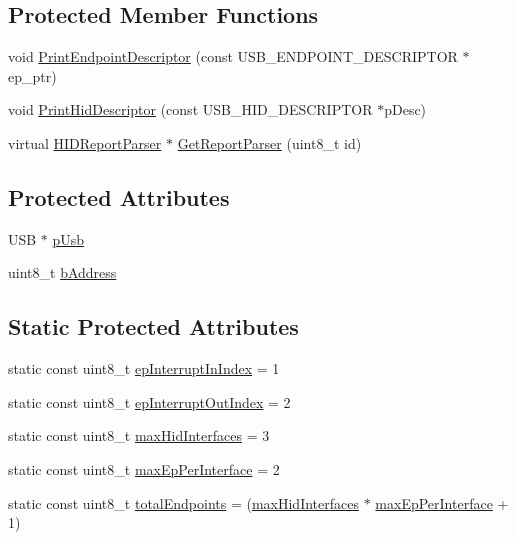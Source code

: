 \subsection*{\-Protected \-Member \-Functions}
\begin{DoxyCompactItemize}
\item 
void \hyperlink{class_h_i_d_a9e2e57ffd2701ebd171842fa9a3f54bd}{\-Print\-Endpoint\-Descriptor} (const \-U\-S\-B\-\_\-\-E\-N\-D\-P\-O\-I\-N\-T\-\_\-\-D\-E\-S\-C\-R\-I\-P\-T\-O\-R $\ast$ep\-\_\-ptr)
\item 
void \hyperlink{class_h_i_d_a733e3944b51dced26ef257f047c227dc}{\-Print\-Hid\-Descriptor} (const \-U\-S\-B\-\_\-\-H\-I\-D\-\_\-\-D\-E\-S\-C\-R\-I\-P\-T\-O\-R $\ast$p\-Desc)
\item 
virtual \hyperlink{class_h_i_d_report_parser}{\-H\-I\-D\-Report\-Parser} $\ast$ \hyperlink{class_h_i_d_ac51c88a0be514a748598008d312adc1d}{\-Get\-Report\-Parser} (uint8\-\_\-t id)
\end{DoxyCompactItemize}
\subsection*{\-Protected \-Attributes}
\begin{DoxyCompactItemize}
\item 
\-U\-S\-B $\ast$ \hyperlink{class_h_i_d_a1583e665c2b930e8683c10dc271f013f}{p\-Usb}
\item 
uint8\-\_\-t \hyperlink{class_h_i_d_a525edb36c2cd8470eae703d3b236e4a7}{b\-Address}
\end{DoxyCompactItemize}
\subsection*{\-Static \-Protected \-Attributes}
\begin{DoxyCompactItemize}
\item 
static const uint8\-\_\-t \hyperlink{class_h_i_d_a845b9961830a6778c296e8571759dd38}{ep\-Interrupt\-In\-Index} = 1
\item 
static const uint8\-\_\-t \hyperlink{class_h_i_d_aeb7fc07fe6dbc98d518967fdbc441ab3}{ep\-Interrupt\-Out\-Index} = 2
\item 
static const uint8\-\_\-t \hyperlink{class_h_i_d_afe5186f46ac7b580bb3dc289e3f237b2}{max\-Hid\-Interfaces} = 3
\item 
static const uint8\-\_\-t \hyperlink{class_h_i_d_acd92969682030cd5cac310dd7746c7c7}{max\-Ep\-Per\-Interface} = 2
\item 
static const uint8\-\_\-t \hyperlink{class_h_i_d_a884aa67312324e7d23a052a6dc80337e}{total\-Endpoints} = (\hyperlink{class_h_i_d_afe5186f46ac7b580bb3dc289e3f237b2}{max\-Hid\-Interfaces} $\ast$ \hyperlink{class_h_i_d_acd92969682030cd5cac310dd7746c7c7}{max\-Ep\-Per\-Interface} + 1)
\end{DoxyCompactItemize}


